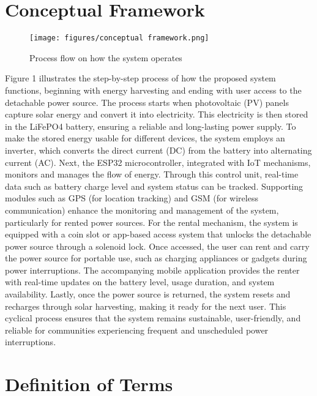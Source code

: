 {\section{Conceptual Framework}

\begin{figure}[H]
	\centering
	\caption{Process flow on how the system operates}
	\label{fig:conceptualfra}
	\texttt{[image: figures/conceptual framework.png]}
\end{figure}


Figure 1 illustrates the step-by-step process of how the proposed system functions, beginning with energy harvesting and ending with user access to the detachable power source. The process starts when photovoltaic (PV) panels capture solar energy and convert it into electricity. This electricity is then stored in the LiFePO4 battery, ensuring a reliable and long-lasting power supply. To make the stored energy usable for different devices, the system employs an inverter, which converts the direct current (DC) from the battery into alternating current (AC). Next, the ESP32 microcontroller, integrated with IoT mechanisms, monitors and manages the flow of energy. Through this control unit, real-time data such as battery charge level and system status can be tracked. Supporting modules such as GPS (for location tracking) and GSM (for wireless communication) enhance the monitoring and management of the system, particularly for rented power sources. For the rental mechanism, the system is equipped with a coin slot or app-based access system that unlocks the detachable power source through a solenoid lock. Once accessed, the user can rent and carry the power source for portable use, such as charging appliances or gadgets during power interruptions. The accompanying mobile application provides the renter with real-time updates on the battery level, usage duration, and system availability. Lastly, once the power source is returned, the system resets and recharges through solar harvesting, making it ready for the next user. This cyclical process ensures that the system remains sustainable, user-friendly, and reliable for communities experiencing frequent and unscheduled power interruptions.

\section{Definition of Terms}

\begin{description}


\end{description}}
